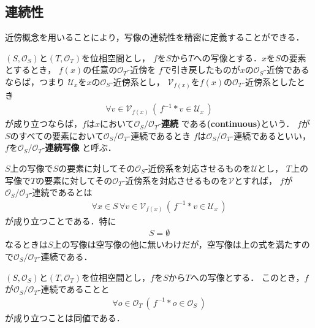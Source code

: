 \subsection{連続性}
	近傍概念を用いることにより，写像の連続性を精密に定義することができる．
	
	\begin{screen}
		\begin{dfn}[連続]
			$(S,\mathscr{O}_{S})$と$(T,\mathscr{O}_{T})$を位相空間とし，
			$f$を$S$から$T$への写像とする．$x$を$S$の要素とするとき，
			$f(x)$の任意の$\mathscr{O}_{T}$-近傍を
			$f$で引き戻したものが$x$の$\mathscr{O}_{S}$-近傍であるならば，つまり
			$\mathcal{U}_{x}$を$x$の$\mathscr{O}_{S}$-近傍系とし，
			$\mathcal{V}_{f(x)}$を$f(x)$の$\mathscr{O}_{T}$-近傍系としたとき
			\begin{align}
				\forall v \in \mathcal{V}_{f(x)}\,
				\left(\, f^{-1} \ast v \in \mathcal{U}_{x}\, \right)
			\end{align}
			が成り立つならば，$f$は$x$において$\mathscr{O}_{S}/\mathscr{O}_{T}$-{\bf 連続}
			である{\bf (continuous)}という．
			$f$が$S$のすべての要素において$\mathscr{O}_{S}/\mathscr{O}_{T}$-連続であるとき
			$f$は$\mathscr{O}_{S}/\mathscr{O}_{T}$-連続であるといい，
			$f$を$\mathscr{O}_{S}/\mathscr{O}_{T}$-{\bf 連続写像}
			と呼ぶ．
		\end{dfn}
	\end{screen}
	
	$S$上の写像で$S$の要素に対してその$\mathscr{O}_{S}$-近傍系を対応させるものを$\mathcal{U}$とし，
	$T$上の写像で$T$の要素に対してその$\mathscr{O}_{T}$-近傍系を対応させるものを$\mathcal{V}$とすれば，
	$f$が$\mathscr{O}_{S}/\mathscr{O}_{T}$-連続であるとは
	\begin{align}
		\forall x \in S\, \forall v \in \mathcal{V}_{f(x)}\,
		\left(\, f^{-1} \ast v \in \mathcal{U}_{x}\, \right)
	\end{align}
	が成り立つことである．特に
	\begin{align}
		S = \emptyset
	\end{align}
	なるときは$S$上の写像は空写像の他に無いわけだが，空写像は上の式を満たすので$\mathscr{O}_{S}/\mathscr{O}_{T}$-連続である．
	
	\begin{screen}
		\begin{thm}[連続写像は開集合を開集合に引き戻す]
		\label{thm:continuous_iff_preimage_of_open_sets_are_open}
		\label{thm:continuous_on_every_point_iff_continuous}
			$(S,\mathscr{O}_{S})$と$(T,\mathscr{O}_{T})$を位相空間とし，$f$を$S$から$T$への写像とする．
			このとき，$f$が$\mathscr{O}_{S}/\mathscr{O}_{T}$-連続であることと
			\begin{align}
				\forall o \in \mathscr{O}_{T}\, 
				\left(\, f^{-1} \ast o \in \mathscr{O}_{S}\, \right)
			\end{align}
			が成り立つことは同値である．
		\end{thm}
	\end{screen}
	
